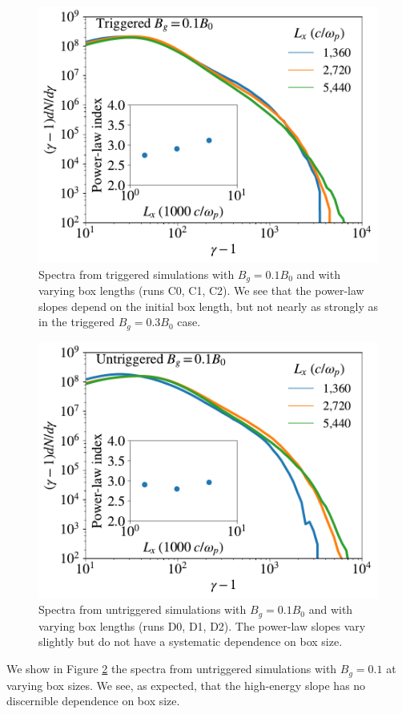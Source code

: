 \begin{figure}[htp] 
\includegraphics[width=\linewidth]{triggered_bguide_1_boxsize.pdf}
\caption{Spectra from triggered simulations with $B_{g}=0.1B_{0}$ and with varying box lengths (runs C0, C1, C2).  We see that the power-law slopes depend on the initial box length, but not nearly as strongly as in the triggered $B_{g}=0.3B_{0}$ case.}
\label{triggered_bg_1_boxsize}
\end{figure}

\begin{figure}[htp] 
	\includegraphics[width=\linewidth]{untriggered_bguide_1_boxsize.pdf}
	\caption{Spectra from untriggered simulations with $B_{g}=0.1B_{0}$ and with varying box lengths (runs D0, D1, D2).  The power-law slopes vary slightly but do not have a systematic dependence on box size.}
	\label{untriggered_bg_1_boxsize}
\end{figure}
We show in Figure \ref{untriggered_bg_1_boxsize} the spectra from untriggered simulations with $B_{g}=0.1$ at varying box sizes.  We see, as expected, that the high-energy slope has no discernible dependence on box size.

